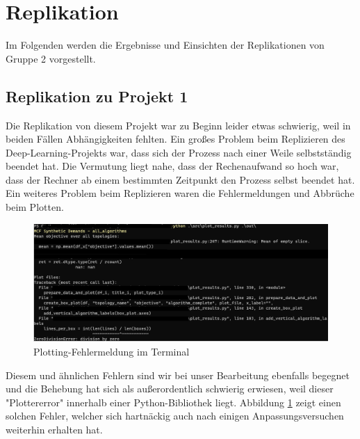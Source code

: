 \documentclass[sigconf, nonacm, review]{acmart}
\begin{document}
\section{Replikation}
Im Folgenden werden die Ergebnisse und Einsichten der Replikationen von Gruppe 2 vorgestellt.
\subsection{Replikation zu Projekt 1}
Die Replikation von diesem Projekt war zu Beginn leider etwas schwierig, weil in beiden F\"allen Abh\"angigkeiten fehlten.
Ein gro\ss es Problem beim Replizieren des Deep-Learning-Projekts war, dass sich der Prozess nach einer Weile selbstst\"andig beendet hat.
Die Vermutung liegt nahe, dass der Rechenaufwand so hoch war, dass der Rechner ab einem bestimmten Zeitpunkt den Prozess selbst beendet hat.
Ein weiteres Problem beim Replizieren waren die Fehlermeldungen und Abbr\"uche beim Plotten. 
\begin{figure}
\centering
\includegraphics[width=\linewidth]{figures/repl_p1_plottererror.png}
\caption{Plotting-Fehlermeldung im Terminal}
\label{fig:repl_p1_plottererrror}
\end{figure}
Diesem und \"ahnlichen Fehlern sind wir bei unser Bearbeitung ebenfalls begegnet und die Behebung hat sich als au\ss erordentlich schwierig erwiesen, weil dieser "Plottererror" innerhalb einer Python-Bibliothek liegt.
Abbildung \ref{fig:repl_p1_plottererrror} zeigt einen solchen Fehler,
welcher sich hartn\"ackig auch nach einigen Anpassungsversuchen weiterhin erhalten hat.
\end{document}
